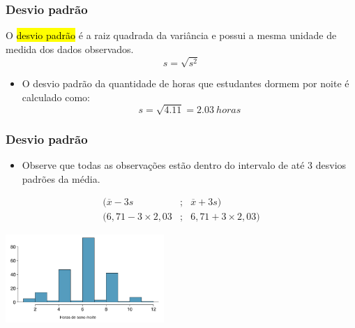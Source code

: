 
\begin{frame}
\frametitle{Desvio padrão}

\justifying
O \hl{desvio padrão} é a raiz quadrada da variância e possui a mesma unidade de medida dos dados observados.
$$
 s = \sqrt{s^2} 
$$
\pause
{}
{
\begin{itemize}
\justifying
\item O desvio padrão da quantidade de horas que estudantes dormem por noite é calculado como:
$$
 s = \sqrt{4.11} = 2.03~horas
$$
\justifying
\end{itemize}
}
{
}

\end{frame}

\begin{frame}
\frametitle{Desvio padrão}

\begin{itemize}
\justifying
$$
 s = \sqrt{4.11} = 2.03~horas
$$
\justifying
\item Observe que todas as observações estão dentro do intervalo de até 3 desvios padrões da média.
\end{itemize}
\begin{eqnarray*}
    (\overline{x}- 3s  &;& \overline{x}+ 3s)\\
     (6,71 -3\times2,03 &;& 6,71 +3\times2,03)
\end{eqnarray*}

\includegraphics[width=6cm]{1-6_numerical_data/sleep_hist.png}

\end{frame}

